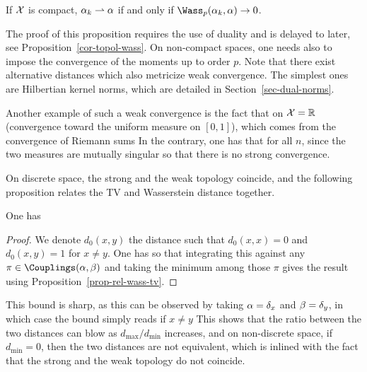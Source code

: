 \begin{prop}
	If $\mathcal{X}$ is compact, $\alpha_k \rightharpoonup \alpha$ if and only if $\Wass_p(\al_k,\al) \rightarrow 0$. 
\end{prop}

The proof of this proposition requires the use of duality and is delayed to later, see Proposition~\ref{cor-topol-wass}. 
On non-compact spaces, one needs also to impose the convergence of the moments up to order $p$.
%
Note that there exist alternative distances which also metricize weak convergence. The simplest ones are Hilbertian kernel norms, which are detailed in Section~\ref{sec-dual-norms}.

Another example of such a weak convergence is the fact that on $\mathcal{X}=\mathbb{R}$
(convergence toward the uniform measure on $[0,1]$), which comes from the convergence of Riemann sums 
In the contrary, one has that for all $n$, since the two measures are mutually singular
so that there is no strong convergence.

On discrete space, the strong and the weak topology coincide, and the following proposition relates the TV and Wasserstein distance together. 

\begin{prop}
	One has
\end{prop}

\begin{proof}
	We denote $d_0(x,y)$ the distance such that $d_0(x,x)=0$ and $d_0(x,y)=1$ for $x \neq y$. One has 
	so that integrating this against any $\pi \in \Couplings(\al,\be)$ and taking the minimum among those $\pi$ gives the result using Proposition~\eqref{prop-rel-wass-tv}. 
\end{proof}

This bound is sharp, as this can be observed by taking $\alpha=\delta_{x}$ and $\beta=\delta_y$, in which case the bound simply reads if $x \neq y$
%
This shows that the ratio between the two distances can blow as $d_{\max}/d_{\min}$ increases, and on non-discrete space, if $d_{\min}=0$, then the two distances are not equivalent, which is inlined with the fact that the strong and the weak topology do not coincide. 



